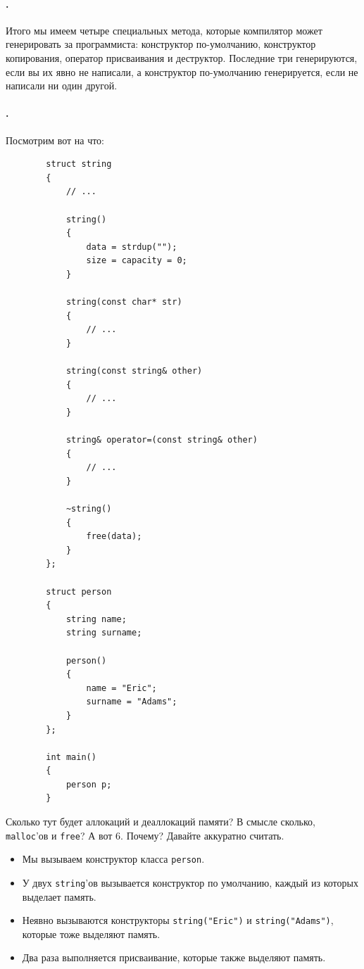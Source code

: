\documentclass{article}
\begin{document}
    \paragraph{.}
    Итого мы имеем четыре специальных метода, которые компилятор может генерировать за программиста: конструктор по-умолчанию, конструктор копирования, оператор присваивания и деструктор. Последние три генерируются, если вы их явно не написали, а конструктор по-умолчанию генерируется, если не написали ни один другой.
    \paragraph{.}
    Посмотрим вот на что:
    \begin{verbatim}
        struct string
        {
            // ...

            string()
            {
                data = strdup("");
                size = capacity = 0;
            }
        
            string(const char* str)
            {
                // ...
            }

            string(const string& other)
            {
                // ...
            }

            string& operator=(const string& other)
            {
                // ...
            }

            ~string()
            {
                free(data);
            }
        };
        
        struct person
        {
            string name;
            string surname;

            person()
            {
                name = "Eric";
                surname = "Adams";
            }
        };

        int main()
        {
            person p;
        }
    \end{verbatim}
    Сколько тут будет аллокаций и деаллокаций памяти? В смысле сколько, \texttt{malloc}'ов и \texttt{free}? А вот 6. Почему? Давайте аккуратно считать.
    \begin{itemize}
        \item[0.] Мы вызываем конструктор класса \texttt{person}.
        \item[2.] У двух \texttt{string}'ов вызывается конструктор по умолчанию, каждый из которых выделает память.
        \item[4.] Неявно вызываются конструкторы \texttt{string("Eric")} и \texttt{string("Adams")}, которые тоже выделяют память.
        \item[6.] Два раза выполняется присваивание, которые также выделяют память.
    \end{itemize}
\end{document}

